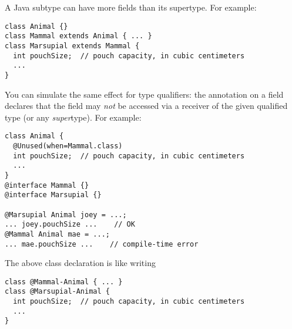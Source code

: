 A Java subtype can have more fields than its supertype.  For example:

\begin{Verbatim}
class Animal {}
class Mammal extends Animal { ... }
class Marsupial extends Mammal {
  int pouchSize;  // pouch capacity, in cubic centimeters
  ...
}
\end{Verbatim}

You can simulate
the same effect for type qualifiers:
the  annotation
on a field declares that the field may \emph{not} be accessed via a receiver of
the given qualified type (or any \emph{super}type).
For example:

\begin{Verbatim}
class Animal {
  @Unused(when=Mammal.class)
  int pouchSize;  // pouch capacity, in cubic centimeters
  ...
}
@interface Mammal {}
@interface Marsupial {}

@Marsupial Animal joey = ...;
... joey.pouchSize ...    // OK
@Mammal Animal mae = ...;
... mae.pouchSize ...    // compile-time error
\end{Verbatim}

The above class declaration is like writing

\begin{Verbatim}
class @Mammal-Animal { ... }
class @Marsupial-Animal {
  int pouchSize;  // pouch capacity, in cubic centimeters
  ...
}
\end{Verbatim}


